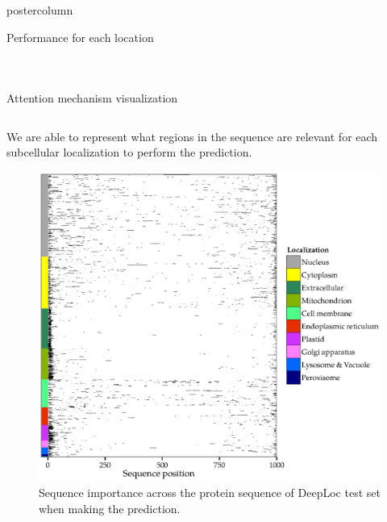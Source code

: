 \documentclass[final,hyperref={pdfpagelabels=false}]{beamer}
\begin{document}
\begin{frame}
\begin{columns}
\begin{column}{.49\paperwidth}
\begin{beamercolorbox}[center,wd=\textwidth]{postercolumn}
\begin{minipage}[T]{.99\textwidth}
{\begin{block}{Performance for each location}
\begin{columns}
\begin{column}{1\textwidth}
\begin{minipage}[t]{.95\textwidth}
\begin{table}[h]
\begin{tabular}{p{8cm}p{2cm}p{2cm}p{2cm}p{2cm}p{2cm}p{2cm}p{2cm}p{2cm}p{2cm}p{2cm}p{2.5cm}p{2.5cm}}
\end{tabular}
\end{table}


\end{minipage}

\end{column}
\end{columns}
\end{block}

\vfill

\begin{block}{Attention mechanism visualization}

\begin{columns}
\begin{column}{1\textwidth}

\centering

\centering
\begin{minipage}[t]{.95\textwidth}


\vspace{-0.5cm}

\small{We are able to represent what regions in the sequence are relevant for each subcellular localization to perform the prediction.}

\vspace{0.4cm}
\begin{figure}
\centering
\includegraphics[width=0.9\linewidth]{Sequence_importance.eps}
 \caption{Sequence importance across the protein sequence of DeepLoc test set when making the prediction.}
\end{figure}  



\end{minipage}
\end{column}
\end{columns}
\end{block}}
\end{minipage}
\end{beamercolorbox}
\end{column}
\end{columns}
\end{frame}
\end{document}
